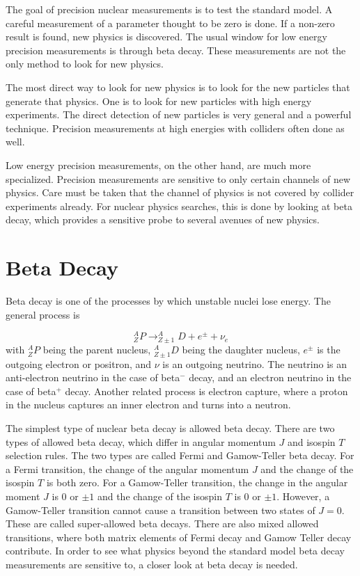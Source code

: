 \documentclass[../MaxHughesThesis.tex]{subfiles}
\begin{document}
The goal of precision nuclear measurements is to test the standard model.
A careful measurement of a parameter thought to be zero is done.
If a non-zero result is found, new physics is discovered.
The usual window for low energy precision measurements is through beta decay.
These measurements are not the only method to look for new physics.

The most direct way to look for new physics is to look for the new particles that generate that physics.
One is to look for new particles with high energy experiments. 
The direct detection of new particles is very general and a powerful technique.
Precision measurements at high energies with colliders often done as well. 
 
Low energy precision measurements, on the other hand, are much more specialized.
Precision measurements are sensitive to only certain channels of new physics.
Care must be taken that the channel of physics is not covered by collider experiments already.
For nuclear physics searches, this is done by looking at beta decay, which provides a sensitive probe to several avenues of new physics.

\section{Beta Decay}
Beta decay is one of the processes by which unstable nuclei lose energy.
The general process is %

\begin{equation}
	\label{eq:betadecay}
	^{A}_{Z}P \rightarrow ^{A}_{Z\pm 1}D + e^{\pm} + \nu_{e}
\end{equation}
with $^{A}_{Z}P$ being the parent nucleus, $^{A}_{Z \pm 1}D$ being the daughter nucleus, $e^{\pm}$ is the outgoing electron or positron, and $\nu$ is an outgoing neutrino.
The neutrino is an anti-electron neutrino in the case of beta$^{-}$ decay, and an electron neutrino in the case of beta$^{+}$ decay. 
Another related process is electron capture, where a proton in the nucleus captures an inner electron and turns into a neutron.

The simplest type of nuclear beta decay is allowed beta decay.
There are two types of allowed beta decay, which differ in angular momentum $J$ and isospin $T$ selection rules.
The two types are called Fermi and Gamow-Teller beta decay. 
For a Fermi transition, the change of the angular momentum $J$ and the change of the isospin $T$ is both zero.
For a Gamow-Teller transition, the change in the angular moment $J$ is $0$ or $\pm1$ and the change of the isospin $T$ is $0$ or $\pm 1$.
However, a Gamow-Teller transition cannot cause a transition between two states of $J = 0$. 
These are called super-allowed beta decays.
There are also mixed allowed transitions, where both matrix elements of Fermi decay and Gamow Teller decay contribute.
In order to see what physics beyond the standard model beta decay measurements are sensitive to, a closer look at beta decay is needed.
\end{document}
